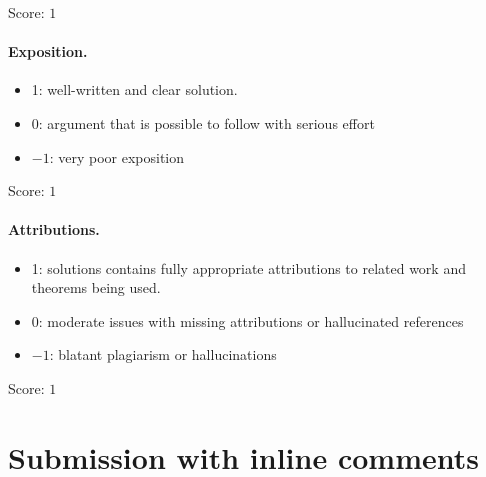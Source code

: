 \documentclass[11pt]{article}
\theoremstyle{remark}
\newcommand{\U}{U_q}
\newcommand{\slN}{\mathfrak{sl}_n}
\newcommand{\bp}{\mathfrak b_+}
\newcommand{\bm}{\mathfrak b_-}
\newcommand{\redS}{\overline{\mathcal S}_n}
\newcommand{\Bstar}{\mathfrak B^*}
\newcommand{\cD}{\mathcal D}
\begin{document}
\noindent Score: $1$

\paragraph{Exposition.}
\begin{itemize}
	\item  1: well-written and clear solution.
	\item  0: argument that is possible to follow with serious effort
	\item  $-1$: very poor exposition
\end{itemize}

\noindent Score: $1$

\paragraph{Attributions.}
\begin{itemize}
	\item  1: solutions contains fully appropriate attributions
		to related work and theorems being used.
	\item  0: moderate issues with missing attributions or hallucinated references
	\item  $-1$: blatant plagiarism or hallucinations
\end{itemize}

\noindent Score: $1$

\newpage
\section{Submission with inline comments}


\begin{abstract}
We construct an explicit algebra isomorphism between the generalized
quantum double $\cD=\U(\bm)\bowtie\U(\bp)$ of the Borel subalgebras of
the simply-connected $\U(\slN)$, for the Drinfeld--Tanisaki skew
pairing, and the reduced stated $SL_n$-skein algebra $\redS(\Bstar)$ of
a bigon with one interior puncture: the two families of horizontal arcs
of $\Bstar$ become a lower and an upper triangular quantum matrix, whose
diagonal entries generate the two copies of the weight torus and whose
off-diagonal entries are root vectors up to toral factors. We deduce
that $\U(\slN)$ is the quotient of $\redS(\Bstar)$ by the relations
$b_{aa}c_{aa}=1$ between the diagonal entries.
For $n=2$ both statements are due to Korinman. The proof combines the
L\^e--Sikora factorization of stated skein algebras with the
Faddeev--Reshetikhin--Takhtajan realization of quantum Borel algebras
by triangular quantum matrices, with all normalizations made explicit.
\end{abstract}
\end{document}
